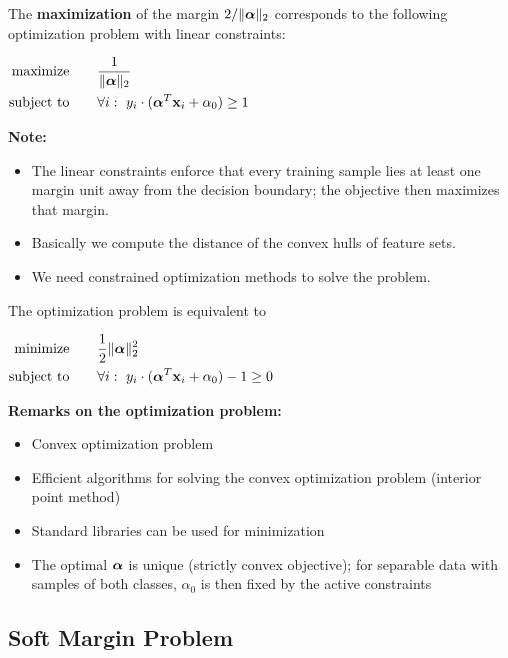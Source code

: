   The  \textbf{maximization} of the margin $2/\|\bm{\mathrm{\alpha}}\|_2$ corresponds to the following optimization problem with linear constraints:
  \begin{center}
        $\begin{aligned}
           \displaystyle 
           \mbox{maximize}   &\qquad \frac{1}{\|\bm{\mathrm{\alpha}}\|_2} \\
           \mbox{subject to} &\qquad \forall i:~ y_i\cdot (\bm{\mathrm{\alpha}}^T\bm{\mathrm{x}}_i + \alpha_0) \geq 1
        \end{aligned}$
  \end{center}
 \textbf {Note:}
  \begin{itemize}
    \item The linear constraints enforce that every training sample lies at least one margin unit away from the decision boundary; the objective then maximizes that margin.
    \item Basically we compute the distance of the convex hulls of feature sets. 
    \item We need constrained optimization methods to solve the problem.
  \end{itemize}
  The optimization problem is equivalent to 
  \begin{center}
       $\begin{aligned}
           \displaystyle 
           \mbox{minimize}   &\qquad \frac{1}{2} {\|\bm{\mathrm{\alpha}}\|^2_2} \\
           \mbox{subject to} &\qquad \forall i:~ y_i\cdot (\bm{\mathrm{\alpha}}^T\bm{\mathrm{x}}_i + \alpha_0) -1 \geq 0
        \end{aligned}$
   \end{center}
  \textbf {Remarks on the optimization problem:}
  
  \begin{itemize}
    \item Convex optimization problem 
    \item Efficient algorithms for solving the convex optimization problem (interior point method) 
    \item Standard libraries can be used for minimization 
    \item The optimal $\bm{\mathrm{\alpha}}$ is unique (strictly convex objective); for separable data with samples of both classes, $\alpha_0$ is then fixed by the active constraints
  \end{itemize}

\subsection{Soft Margin Problem}

